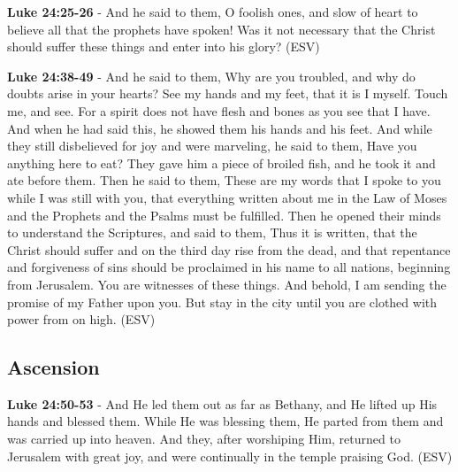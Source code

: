 \documentclass[11pt]{article}
\begin{document}
\textbf{Luke 24:25-26} - And he said to them, O foolish ones, and slow of heart to believe all that the prophets have spoken! Was it not necessary that the Christ should suffer these things and enter into his glory? (ESV)

\textbf{Luke 24:38-49} - And he said to them, Why are you troubled, and why do doubts arise in your hearts? See my hands and my feet, that it is I myself. Touch me, and see. For a spirit does not have flesh and bones as you see that I have. And when he had said this, he showed them his hands and his feet. And while they still disbelieved for joy and were marveling, he said to them, Have you anything here to eat? They gave him a piece of broiled fish, and he took it and ate before them. Then he said to them, These are my words that I spoke to you while I was still with you, that everything written about me in the Law of Moses and the Prophets and the Psalms must be fulfilled. Then he opened their minds to understand the Scriptures, and said to them, Thus it is written, that the Christ should suffer and on the third day rise from the dead, and that repentance and forgiveness of sins should be proclaimed in his name to all nations, beginning from Jerusalem. You are witnesses of these things. And behold, I am sending the promise of my Father upon you. But stay in the city until you are clothed with power from on high. (ESV)

\subsection{Ascension}
\label{sec:org8f1553f}
\textbf{Luke 24:50-53} - And He led them out as far as Bethany, and He lifted up His hands and blessed them. While He was blessing them, He parted from them and was carried up into heaven. And they, after worshiping Him, returned to Jerusalem with great joy, and were continually in the temple praising God. (ESV)
\end{document}
